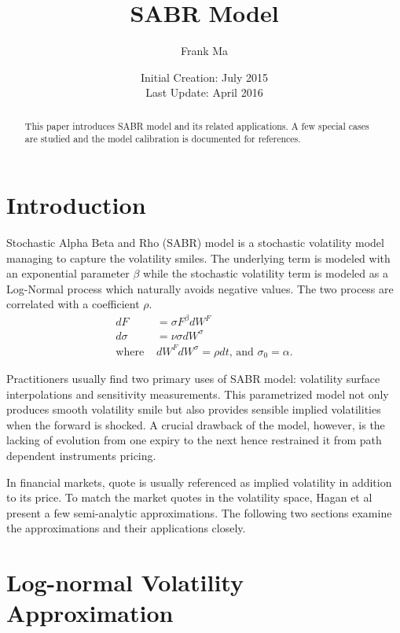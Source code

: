 \documentclass{article}
\title{SABR Model}
\author{Frank Ma}
\date{Initial Creation: July 2015 \\ Last Update: April 2016}
\begin{document}
\maketitle

\begin{abstract}
    This paper introduces SABR model and its related applications.
    A few special cases are studied and the model calibration is documented for references.
\end{abstract}

\section{Introduction}

Stochastic Alpha Beta and Rho (SABR) model is a stochastic volatility model managing to capture the volatility smiles.
The underlying term is modeled with an exponential parameter $ \beta $ while the stochastic volatility term is modeled as a Log-Normal process which naturally avoids negative values.
The two process are correlated with a coefficient $ \rho $.
\begin{align}
    d F &= \sigma F^{\beta} d W^F \\
    d \sigma &= \nu \sigma d W^{\sigma} \\
    \text{where } & d W^F d W^{\sigma} = \rho d t \text{, and } {\sigma}_0 = \alpha \text{.}\nonumber
\end{align}

Practitioners usually find two primary uses of SABR model: volatility surface interpolations and sensitivity measurements.
This parametrized model not only produces smooth volatility smile but also provides sensible implied volatilities when the forward is shocked.
A crucial drawback of the model, however, is the lacking of evolution from one expiry to the next hence restrained it from path dependent instruments pricing.

In financial markets, quote is usually referenced as implied volatility in addition to its price.
To match the market quotes in the volatility space, Hagan et al \cite{Managing Smile Risk} present a few semi-analytic approximations.
The following two sections examine the approximations and their applications closely.


\section{Log-normal Volatility Approximation}
\end{document}
